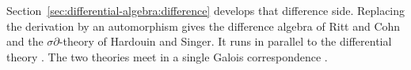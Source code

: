Section~\ref{sec:differential-algebra:difference} develops that difference
side. Replacing the derivation by an automorphism gives the difference
algebra of Ritt and Cohn and the $\sigma\partial$-theory of Hardouin and
Singer. It runs in parallel to the differential theory
\cite[p.~912]{MikhalevPankratev1989}. The two theories meet in a single
Galois correspondence \cite[Theorem~2.6, p.~6]{HardouinSinger2008}.

